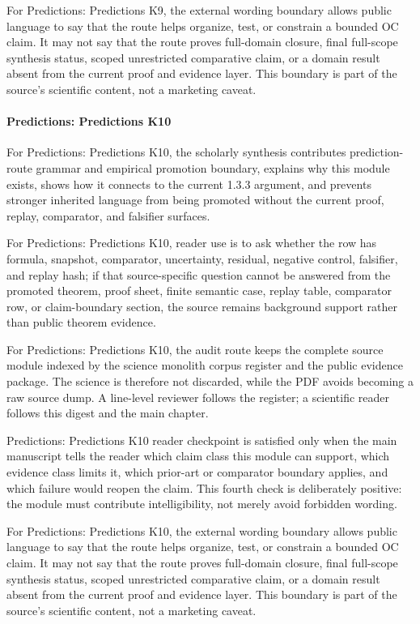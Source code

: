 For Predictions: Predictions K9, the external wording boundary allows public language to say that the route helps organize, test, or constrain a bounded OC claim. It may not say that the route proves full-domain closure, final full-scope synthesis status, scoped unrestricted comparative claim, or a domain result absent from the current proof and evidence layer. This boundary is part of the source's scientific content, not a marketing caveat.


\paragraph{Predictions: Predictions K10}

For Predictions: Predictions K10, the scholarly synthesis contributes prediction-route grammar and empirical promotion boundary, explains why this module exists, shows how it connects to the current 1.3.3 argument, and prevents stronger inherited language from being promoted without the current proof, replay, comparator, and falsifier surfaces.


For Predictions: Predictions K10, reader use is to ask whether the row has formula, snapshot, comparator, uncertainty, residual, negative control, falsifier, and replay hash; if that source-specific question cannot be answered from the promoted theorem, proof sheet, finite semantic case, replay table, comparator row, or claim-boundary section, the source remains background support rather than public theorem evidence.


For Predictions: Predictions K10, the audit route keeps the complete source module indexed by the science monolith corpus register and the public evidence package. The science is therefore not discarded, while the PDF avoids becoming a raw source dump. A line-level reviewer follows the register; a scientific reader follows this digest and the main chapter.


Predictions: Predictions K10 reader checkpoint is satisfied only when the main manuscript tells the reader which claim class this module can support, which evidence class limits it, which prior-art or comparator boundary applies, and which failure would reopen the claim. This fourth check is deliberately positive: the module must contribute intelligibility, not merely avoid forbidden wording.


For Predictions: Predictions K10, the external wording boundary allows public language to say that the route helps organize, test, or constrain a bounded OC claim. It may not say that the route proves full-domain closure, final full-scope synthesis status, scoped unrestricted comparative claim, or a domain result absent from the current proof and evidence layer. This boundary is part of the source's scientific content, not a marketing caveat.


